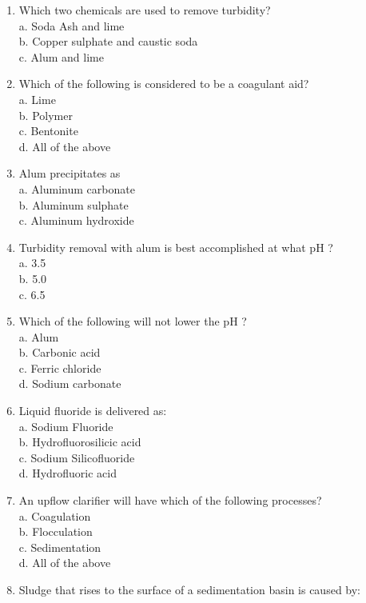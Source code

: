 \begin{enumerate}
\item Which two chemicals are used to remove turbidity?\\
a. Soda Ash and lime\\
b. Copper sulphate and caustic soda\\
c. Alum and lime\\
\item Which of the following is considered to be a coagulant aid?\\
a. Lime\\
b. Polymer\\
c. Bentonite\\
d. All of the above\\
\item Alum precipitates as\\
a. Aluminum carbonate\\
b. Aluminum sulphate\\
c. Aluminum hydroxide\\
\item Turbidity removal with alum is best accomplished at what $\mathrm{pH}$ ?\\
a. 3.5\\
b. 5.0\\
c. 6.5\\
\item Which of the following will not lower the $\mathrm{pH}$ ?\\
a. Alum\\
b. Carbonic acid\\
c. Ferric chloride\\
d. Sodium carbonate\\
\item Liquid fluoride is delivered as:\\
a. Sodium Fluoride\\
b. Hydrofluorosilicic acid\\
c. Sodium Silicofluoride\\
d. Hydrofluoric acid\\
\item An upflow clarifier will have which of the following processes?\\
a. Coagulation\\
b. Flocculation\\
c. Sedimentation\\
d. All of the above\\
\item Sludge that rises to the surface of a sedimentation basin is caused by:\\

\end{enumerate}

